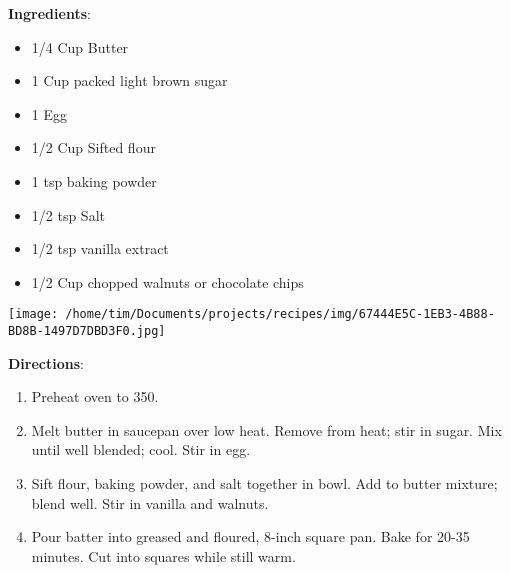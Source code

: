 \documentclass[11pt, twoside, openany]{book}
\begin{document}
\begin{minipage}[t]{0.8\linewidth}
\textbf{Ingredients}:\vspace{-3mm}
\begin{multicols}{2}
\begin{itemize}\setlength\itemsep{-1mm}
\item 1/4 Cup Butter
\item 1 Cup packed light brown sugar
\item 1 Egg
\item 1/2 Cup Sifted flour
\item 1 tsp baking powder
\item 1/2 tsp Salt
\item 1/2 tsp vanilla extract
\item 1/2 Cup chopped walnuts or chocolate chips
\end{itemize}
\end{multicols}
\end{minipage}
\begin{minipage}[t]{0.2\linewidth}
\centering \strut\vspace*{-\baselineskip}\newline
\texttt{[image: /home/tim/Documents/projects/recipes/img/67444E5C-1EB3-4B88-BD8B-1497D7DBD3F0.jpg]}\\
\end{minipage}\vspace{3mm}
\textbf{Directions}:
\vspace{-3mm}\begin{enumerate}\setlength\itemsep{-1mm}
\item Preheat oven to 350. 
\item Melt butter in saucepan over low heat. Remove from heat; stir in sugar. Mix until well blended; cool. Stir in egg.
\item Sift flour, baking powder, and salt together in bowl. Add to butter mixture; blend well. Stir in vanilla and walnuts.
\item Pour batter into greased and floured, 8-inch square pan. Bake for 20-35 minutes. Cut into squares while still warm.
\end{enumerate}
 \label{sweet-potatoes-mashed}\hfill\textit{}\\
\end{document}
